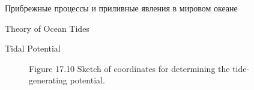 \begin{chapter}{Прибрежные процессы и приливные явления в мировом океане}
\begin{section}{Theory of Ocean Tides}
\begin{paragraph}{Tidal Potential}
\begin{figure}[h!]
\caption{Figure 17.10 Sketch of coordinates for determining the
tide-generating potential.}
\label{fig:tidesketch}
\end{figure}
%
%


\end{paragraph}
\end{section}
\end{chapter}

